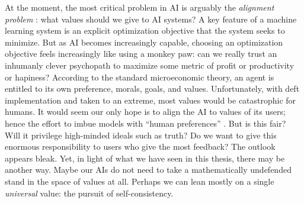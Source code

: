 {%
At the moment, the most critical problem in
    AI is arguably the \emph{alignment problem}
\citep{wiener-alignment1960,alignment-zhuang-2020-NeurIPS,bostrom-superintelligence,christian2020alignment}:
what values should we give to AI systems? 
A key feature of a machine learning system is an explicit optimization objective that the system seeks to minimize. 
But as AI becomes increasingly capable, choosing an optimization objective feels increasingly like using a monkey paw:
can we really trust an inhumanly clever psychopath to maximize some metric of profit or productivity or hapiness? 
According to the standard microeconomic theory, an agent is entitled to its own preference, morals, goals, and values.
Unfortunately, with deft implementation and taken to an extreme, most values would be catastrophic for humans. 
It would seem our only hope is to align the AI to values of its users;
    hence the effort to imbue models with 
    ``human preferences'' \citep{christiano2017deep}.
%
But is this fair? Will it privilege high-minded ideals such as truth? Do we want to give this enormous responsibility to users who give the most feedback?
The outlook appears bleak.
Yet, in light of what we have seen in this thesis, there may be another way. 
Maybe our AIs do not need to take a mathematically undefended stand in the space of values at all. 
Perhaps we can lean mostly on a single \emph{universal} value: 
the pursuit of self-consistency.
}%


